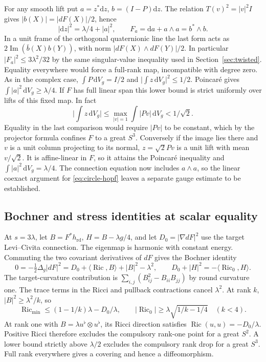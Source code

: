 \documentclass[11pt]{article}
\numberwithin{equation}{section}
\DeclareMathOperator{\Ric}{Ric}
\newcommand{\rd}{\mathrm{rd}}
\newcommand{\dd}{\mathrm{d}}
\newcommand{\ip}[2]{\langle #1,#2\rangle}
\newcommand{\abs}[1]{\lvert #1\rvert}
\newcommand{\dv}{\dd V_g}
\begin{document}
For any smooth lift put \(a=z^*\dd z\), \(b=(I-P)\dd z\).
The relation \(T(v)^2=\abs v^2 I\) gives
\(\abs{b(X)}=\abs{dF(X)}/2\), hence
\[
 \abs{\dd z}^2=\lambda/4+\abs a^2,\qquad
 F_a=\dd a+a\wedge a=b^*\wedge b.
\]
In a unit frame of the orthogonal quaternionic line the last
form acts as \(2\operatorname{Im}(\bar b(X)b(Y))\), with norm
\(\abs{dF(X)\wedge dF(Y)}/2\).
In particular \(\abs{F_a}^2\le 3\lambda^2/32\) by the same
singular-value inequality used in Section~\ref{sec:twisted}.
Equality everywhere would force a full-rank map, incompatible
with degree zero. As in the complex case,
\(\int P\,\dv=I/2\) and \(\abs{\int z\,\dv}^2\le1/2\).
Poincar\'e gives \(\int\abs a^2\,\dv\ge\lambda/4\).
If \(F\) has full linear span this lower bound is strict
uniformly over lifts of this fixed map. In fact
\[
 \abs{\int z\,\dv}\le \max_{\abs v=1}\int\abs{Pv}\,\dv
                 <1/\sqrt2.
\]
Equality in the last comparison would require \(\abs{Pv}\) to
be constant, which by the projector formula confines \(F\) to a
great \(S^3\). Conversely if the image lies there and \(v\) is a
unit column projecting to its normal, \(z=\sqrt2 Pv\) is a unit
lift with mean \(v/\sqrt2\). It is affine-linear in \(F\), so it
attains the Poincar\'e inequality and \(\int\abs a^2\,\dv=\lambda/4\).
The connection equation now includes \(a\wedge a\), so the
linear coexact argument for \eqref{eq:circle-hopf} leaves a
separate gauge estimate to be established.

\subsection{Bochner and stress identities at scalar equality}

At \(s=3\lambda\), let \(B=F^*h_{\rd}\), \(H=B-\lambda g/4\),
and let \(D_0=\abs{\nabla dF}^2\) use the target Levi--Civita
connection. The eigenmap is harmonic with constant energy.
Commuting the two covariant derivatives of \(dF\) gives the
Bochner identity
\begin{equation}\label{eq:map-bochner}
 0=-\tfrac12\Delta_g\abs{dF}^2
   =D_0+\ip{\Ric}{B}+\abs B^2-\lambda^2 ,
 \qquad D_0+\abs H^2=-\ip{\Ric_0}{H}.
\end{equation}
The target-curvature contribution is
\(\sum_{i,j}(B_{ij}^2-B_{ii}B_{jj})\) by round curvature one.
The trace terms in the Ricci and pullback contractions cancel
\(\lambda^2\).
At rank \(k\), \(\abs B^2\ge\lambda^2/k\), so
\[
 \Ric_{\min}\le (1-1/k)\lambda-D_0/\lambda,\qquad
 \abs{\Ric_0}\ge\lambda\sqrt{1/k-1/4}\quad(k<4).
\]
At rank one with \(B=\lambda u^\flat\otimes u^\flat\), its
Ricci direction satisfies \(\Ric(u,u)=-D_0/\lambda\).
Positive Ricci therefore excludes the compulsory rank-one
point for a great \(S^2\). A lower bound strictly above
\(\lambda/2\) excludes the compulsory rank drop for a great
\(S^3\). Full rank everywhere gives a covering and hence
a diffeomorphism.
\end{document}
